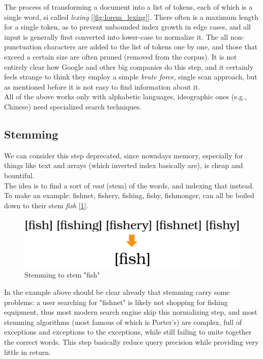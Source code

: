 The process of transforming a document into a list of tokens, each of which is a single word, si called \textit{lexing} [\ref{fig:lorem_lexing}]. There often is a maximum length for a single token, as to prevent unbounded index growth in edge cases, and all input is generally first converted into lower-case to normalize it. The all non-punctuation characters are added to the list of tokens one by one, and those that exceed a certain size are often pruned (removed from the corpus). It is not entirely clear how Google and other big companies do this step, and it certainly feels strange to think they employ a simple \textit{brute force}, single scan approach, but as mentioned before it is not easy to find information about it. \\
All of the above works only with alphabetic languages, ideographic ones (e.g., Chinese) need specialized search techniques. 

\subsection{Stemming}

We can consider this step deprecated, since nowadays memory, especially for things like text and arrays (which inverted index basically are), is cheap and bountiful. \\
The idea is to find a sort of \textit{root} (stem) of the words, and indexing that instead. To make an example: fishnet, fishery, fishing, fishy, fishmonger, can all be boiled down to their stem \textit{fish} [\ref{fig:fishstem}]. 

\begin{figure}[ht] 
\begin{center}
\includegraphics[width=.8\textwidth]{imgs/stemming.png}
\caption{Stemming to stem "fish"\label{fig:fishstem}}
\end{center}
\end{figure}

In the example above should be clear already that stemming carry some problems: a user searching for "fishnet" is likely not shopping for fishing equipment, thus most modern search engine skip this normalizing step, and most stemming algorithms (most famous of which is Porter's) are complex, full of exceptions and exceptions to the exceptions, while still failing to unite together the correct words. This step basically reduce query precision while providing very little in return.

